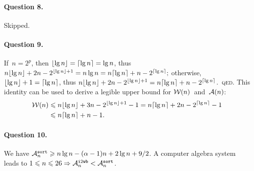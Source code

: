 \paragraph{Question 8.} Skipped.

\medskip

\paragraph{Question 9.}

If~\(n=2^p\), then \(\floor{\lg n} = \ceiling{\lg n} = \lg n\), thus
\(n\floor{\lg n} + 2n - 2^{\floor{\lg n}+1} = n\lg n = n\ceiling{\lg
  n} + n - 2^{\ceiling{\lg n}};\) otherwise, \(\floor{\lg n} + 1 =
\ceiling{\lg n}\), thus \(n\floor{\lg n} + 2n - 2^{\floor{\lg n}+1} =
n\ceiling{\lg n} + n - 2^{\ceiling{\lg n}}\).~\textsc{qed.} This
identity can be used to derive a legible upper bound for
\(\Wideal(n)\)~and~\(\Aideal(n)\):
\begin{align*}
\Wideal(n) &\leqslant n\floor{\lg n} + 3n - 2^{\floor{\lg n}+1} - 1 
= n\ceiling{\lg n} + 2n - 2^{\ceiling{\lg n}} - 1\\
 &\leqslant n\ceiling{\lg n} + n - 1.
\end{align*}

\medskip

\paragraph{Question 10.}

We have \(\ave{sort}{n} \geqslant n\lg n - (\alpha - 1) n + 2\lg n +
9/2\). A computer algebra system leads to \(1 \leqslant n \leqslant 26
\Rightarrow \ave{i2wb}{n} < \ave{sort}{n}\).
